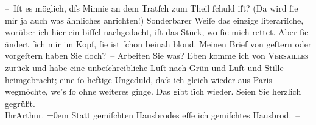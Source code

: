 \begin{ledgroupsized}[t]{13cm}
           \pstart
           – Iſt es möglich, dſs Minnie an dem Tratſch
               zum Theil ſchuld iſt? (Da wird ſie mir ja auch was ähnliches anrichten!) Sonderbarer
               Weiſe das einzige literariſche, worüber ich hier ein biſſel nachgedacht, iſt das Stück, wo  ſie mich {\pb}rettet. Aber
               ſie ändert ſich mir im Kopf, ſie ist ſchon beinah blond.\pend
           \pstart
           Meinen Brief von geſtern oder vorgeſtern haben Sie doch? –\pend
           \pstart
           Arbeiten Sie was?\pend
           \pstart
           Eben komme ich von \textsc{Versailles} zurück und habe eine unbeſchreibliche Luſt nach Grün und Luft und Stille
                  heimge{\pb}bracht; eine ſo heftige Ungeduld, daſs ich
               gleich wieder aus Paris wegmöchte, we{\geminationn}’s ſo ohne
               weiteres ginge.\pend
           \pstart
           Das gibt ſich wieder.\pend
           \pstart
           Seien Sie herzlich gegrüßt.{\\[\baselineskip]}Ihr\spacefill\mbox{Arthur.}\pend
           \leftskip=0em{}\pstart
           \noindent{}Statt gemiſchten Hausbrodes eſſe ich gemiſchtes Hausbrod. –\pend
           
         
         \endnumbering{}\end{ledgroupsized}  \newcommand{\dateiname}{L00672}\newcommand{\titel}{Arthur Schnitzler an Hugo von Hofmannsthal, 28. 4. 1897}\newcommand{\editorInnen}{Martin Anton Müller und Gerd-Hermann Susen}
      